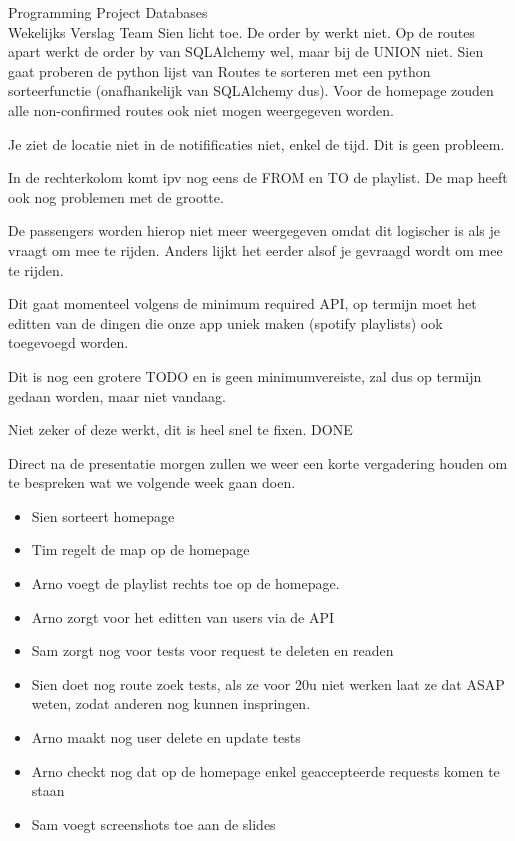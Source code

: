 \documentclass{article}
\newcounter{team}
\begin{document}
\begin{Minutes}{Programming Project Databases \\ Wekelijks Verslag Team }
				    Sien licht toe. De order by werkt niet. Op de routes apart werkt de order by van SQLAlchemy wel, maar bij de UNION niet. Sien gaat proberen de python lijst van Routes te sorteren met een python sorteerfunctie (onafhankelijk van SQLAlchemy dus).
				    Voor de homepage zouden alle non-confirmed routes ook niet mogen weergegeven worden.

				    Je ziet de locatie niet in de notifificaties niet, enkel de tijd. Dit is geen probleem.

				    In de rechterkolom komt ipv nog eens de FROM en TO de playlist. De map heeft ook nog problemen met de grootte.

				    De passengers worden hierop niet meer weergegeven omdat dit logischer is als je vraagt om mee te rijden. Anders lijkt het eerder alsof je gevraagd wordt om mee te rijden.

				    Dit gaat momenteel volgens de minimum required API, op termijn moet het editten van de dingen die onze app uniek maken (spotify playlists) ook toegevoegd worden.

				    Dit is nog een grotere TODO en is geen minimumvereiste, zal dus op termijn gedaan worden, maar niet vandaag.

				    Niet zeker of deze werkt, dit is heel snel te fixen. DONE


 		    Direct na de presentatie morgen zullen we weer een korte vergadering houden om te bespreken wat we volgende week gaan doen.

			\begin{itemize}
			   \item Sien sorteert homepage
			   \item Tim regelt de map op de homepage
			   \item Arno voegt de playlist rechts toe op de homepage.
			   \item Arno zorgt voor het editten van users via de API
			   \item Sam zorgt nog voor tests voor request te deleten en readen
			   \item Sien doet nog route zoek tests, als ze voor 20u niet werken laat ze dat ASAP weten, zodat anderen nog kunnen inspringen.
			   \item Arno maakt nog user delete en update tests
			   \item Arno checkt nog dat op de homepage enkel geaccepteerde requests komen te staan
			   \item Sam voegt screenshots toe aan de slides
			\end{itemize}



\end{Minutes}
\end{document}
